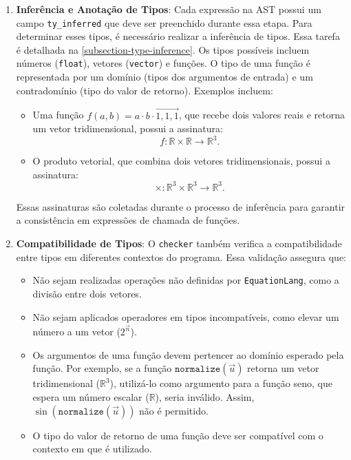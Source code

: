 \begin{enumerate}
    \item \textbf{Inferência e Anotação de Tipos}:
    Cada expressão na AST possui um campo \verb"ty_inferred" que deve ser preenchido durante essa etapa. Para determinar esses tipos, é necessário realizar a inferência de tipos. Essa tarefa é detalhada na \autoref{subsection-type-inference}. Os tipos possíveis incluem números (\verb"float"), vetores (\verb"vector") e funções.
        O tipo de uma função é representada por um domínio (tipos dos argumentos de entrada) e um contradomínio (tipo do valor de retorno). Exemplos incluem:
        \begin{itemize}
            \item Uma função $f(a, b) = a \cdot b \cdot \vec{1,1,1}$, que recebe dois valores reais e retorna um vetor tridimensional, possui a assinatura:
            \[
            f : \mathbb{R} \times \mathbb{R} \to \mathbb{R}^3.
            \]
            \item O produto vetorial, que combina dois vetores tridimensionais, possui a assinatura:
            \[
            \times : \mathbb{R}^3 \times \mathbb{R}^3 \to \mathbb{R}^3.
            \]
        \end{itemize}
        Essas assinaturas são coletadas durante o processo de inferência para garantir a consistência em expressões de chamada de funções.

    \item \textbf{Compatibilidade de Tipos}:
    O \texttt{checker} também verifica a compatibilidade entre tipos em diferentes contextos do programa. Essa validação assegura que:
    \begin{itemize}
        \item Não sejam realizadas operações não definidas por \texttt{EquationLang}, como a divisão entre dois vetores.
        \item Não sejam aplicados operadores em tipos incompatíveis, como elevar um número a um vetor ($2^{\vec{n}}$).
        \item Os argumentos de uma função devem pertencer ao domínio esperado pela função. Por exemplo, se a função $\texttt{normalize}(\vec{u})$ retorna um vetor tridimensional ($\mathbb{R}^3$), utilizá-lo como argumento para a função seno, que espera um número escalar ($\mathbb{R}$), seria inválido. Assim, $\sin(\texttt{normalize}(\vec{u}))$ não é permitido.
        \item O tipo do valor de retorno de uma função deve ser compatível com o contexto em que é utilizado.
    \end{itemize}


\end{enumerate}
